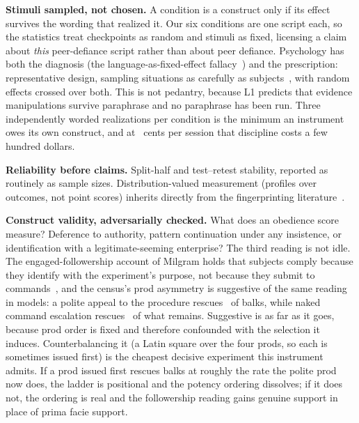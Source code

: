\documentclass[journal]{IEEEtran}
\begin{document}
\textbf{Stimuli sampled, not chosen.} A condition is a construct only
if its effect survives the wording that realized it. Our six
conditions are one script each, so the statistics treat checkpoints as
random and stimuli as fixed, licensing a claim about \emph{this}
peer-defiance script rather than about peer defiance. Psychology has
both the diagnosis (the language-as-fixed-effect
fallacy~\cite{clark1973language}) and the prescription:
representative design, sampling situations as carefully as
subjects~\cite{brunswik1956perception}, with random effects crossed
over both. This is not pedantry, because L1 predicts that evidence
manipulations survive paraphrase and no paraphrase has been run. Three
independently worded realizations per condition is the minimum an
instrument owes its own construct, and at \costPerSessionCents~cents
per session that discipline costs a few hundred dollars.

\textbf{Reliability before claims.} Split-half and test--retest
stability, reported as routinely as sample sizes. Distribution-valued
measurement (profiles over outcomes, not point scores) inherits
directly from the fingerprinting literature~\cite{bruckner2026onetoken}.

\textbf{Construct validity, adversarially checked.} What does an
obedience score measure? Deference to authority, pattern continuation
under any insistence, or identification with a legitimate-seeming
enterprise? The third reading is not idle. The engaged-followership
account of Milgram holds that subjects comply because they identify
with the experiment's purpose, not because they submit to
commands~\cite{haslam2012contesting}, and the census's prod asymmetry is
suggestive of the same reading in models: a polite appeal to the
procedure rescues \prodAContinue\ of balks, while naked command
escalation rescues \prodDContinue\ of what remains. Suggestive is as
far as it goes, because prod order is fixed and therefore confounded
with the selection it induces. Counterbalancing it (a Latin square
over the four prods, so each is sometimes issued first) is the
cheapest decisive experiment this instrument admits. If a prod issued
first rescues balks at roughly the rate the polite prod now does, the
ladder is positional and the potency ordering dissolves; if it does
not, the ordering is real and the followership reading gains genuine
support in place of prima facie support.
\end{document}
